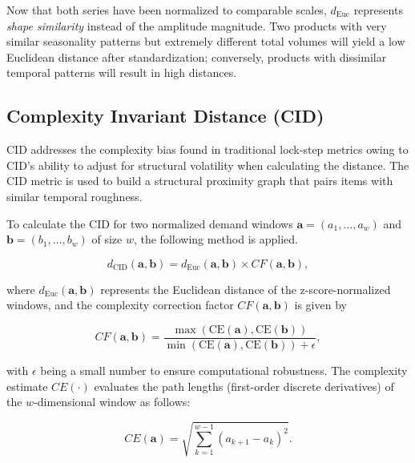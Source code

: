Now that both series have been normalized to comparable scales, $d_{\text{Euc}}$ represents \textit{shape similarity} instead of the amplitude magnitude. Two products with very similar seasonality patterns but extremely different total volumes will yield a low Euclidean distance after standardization; conversely, products with dissimilar temporal patterns will result in high distances.



\subsection{Complexity Invariant Distance (CID)}

CID addresses the complexity bias found in traditional lock-step metrics owing to CID's ability to adjust for structural volatility when calculating the distance. The CID metric is used to build a structural proximity graph that pairs items with similar temporal roughness.

To calculate the CID for two normalized demand windows $\mathbf{a}=(a_1,\dots,a_w)$ and $\mathbf{b}=(b_1,\dots,b_w)$ of size $w$, the following method is applied.

\begin{equation}
d_{\text{CID}}(\mathbf{a}, \mathbf{b}) = d_{\text{Euc}}(\mathbf{a}, \mathbf{b}) \times CF(\mathbf{a}, \mathbf{b}), \label{eq:cid_distance_method}
\end{equation}

where $d_{\text{Euc}}(\mathbf{a}, \mathbf{b})$ represents the Euclidean distance of the z-score-normalized windows, and the complexity correction factor $CF(\mathbf{a}, \mathbf{b})$ is given by

\begin{equation}
CF(\mathbf{a}, \mathbf{b}) = \frac{\max(\mathrm{CE}(\mathbf{a}), \mathrm{CE}(\mathbf{b}))}{\min(\mathrm{CE}(\mathbf{a}), \mathrm{CE}(\mathbf{b})) + \epsilon}, \label{eq:cid_correction_factor}
\end{equation}

with $\epsilon$ being a small number to ensure computational robustness. The complexity estimate $CE(\cdot)$ evaluates the path lengths (first-order discrete derivatives) of the $w$-dimensional window as follows:

\begin{equation}
CE(\mathbf{a}) = \sqrt{\sum_{k=1}^{w-1} (a_{k+1} - a_k)^2}. \label{eq:cid_complexity_estimate}
\end{equation}

